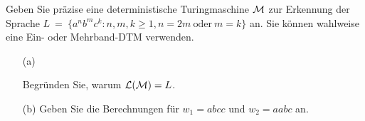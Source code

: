 \begin{exercise}
	
Geben Sie pr\"azise eine deterministische Turingmaschine $\mathcal{M}$ zur Erkennung der Sprache 
$L \ = \  \bigl\{ a^nb^mc^k: n,m,k \geq 1, n=2m  \ \text{oder} \ m = k\}$ an.
Sie k\"onnen wahlweise eine Ein- oder Mehrband-DTM verwenden.

\begin{itemize}
\item [(a)]

Begr\"unden Sie, warum ${\mathcal L}(\mathcal{M}) = L$. 

\item [(b)]
Geben Sie die Berechnungen f\"ur $w_1 = abcc$ und $w_2 = aabc$ an.
\end{itemize}
\end{exercise}

